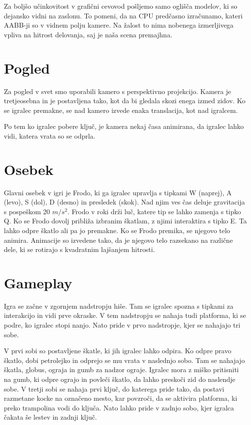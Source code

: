 \documentclass[a4paper,12pt]{article}
\begin{document}
Za boljšo učinkovitost v grafični cevovod pošljemo samo oglišča modelov, ki so dejansko vidni na zaslonu. To pomeni, da na CPU predčasno izračunamo, kateri AABB-ji so v vidnem polju kamere. Na žalost to nima nobenega izmerljivega vpliva na hitrost delovanja, saj je naša scena premajhna.

\section{Pogled}
Za pogled v svet smo uporabili kamero s perspektivno projekcijo. Kamera je tretjeosebna in je postavljena tako, kot da bi gledala skozi enega izmed zidov. Ko se igralec premakne, se nad kamero izvede enaka translacija, kot nad igralcem.

Po tem ko igralec pobere ključ, je kamera nekaj časa animirana, da igralec lahko vidi, katera vrata so se odprla.

\section{Osebek}
 Glavni osebek v igri je Frodo, ki ga igralec upravlja s tipkami W (naprej), A (levo), S (dol), D (desno) in presledek (skok). Nad njim ves čas deluje gravitacija s pospeškom 20 \(m/s^{2} \). Frodo v roki drži luč, katere tip se lahko zamenja s tipko Q. Ko se Frodo dovolj približa izbranim škatlam, z njimi interaktira s tipko E. Ta lahko odpre škatlo ali pa jo premakne.
Ko se Frodo premika, se njegovo telo animira. Animacije so izvedene tako, da je njegovo telo razsekano na različne dele, ki se rotirajo s kvadratnim lajšanjem hitrosti.

\section{Gameplay}
Igra se začne v zgornjem nadstropju hiše. Tam se igralec spozna s tipkami za interakcijo in vidi prve okraske. V tem nadstropju se nahaja tudi platforma, ki se podre, ko igralec stopi nanjo. Nato pride v prvo nadstropje, kjer se nahajajo tri sobe.

 V prvi sobi so postavljene škatle, ki jih igralec lahko odpira. Ko odpre pravo škatlo, dobi petrolejko in odprejo se mu vrata v naslednjo sobo. Tam se nahajajo škatla, globus, ograja in gumb za nadzor ograje. Igralec mora z miško pritisniti na gumb, ki odpre ograjo in povleči škatlo, da lahko preskoči zid do naslendje sobe. V tretji sobi se nahaja prvi ključ, do katerega pride tako, da postavi razmetane kocke na označeno mesto, kar povzroči, da se aktivira platforma, ki preko trampolina vodi do ključa. Nato lahko pride v zadnjo sobo, kjer igralca čakata še lestev in zadnji ključ.
 
\end{document}
